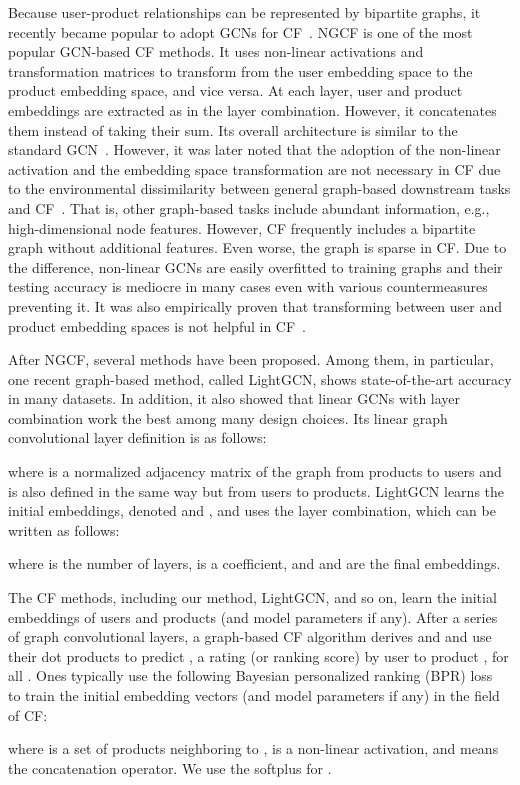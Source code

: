 \documentclass[sigconf]{acmart}
\begin{document}
Because user-product relationships can be represented by bipartite graphs, it recently became popular to adopt GCNs for CF~\cite{10.1145/3331184.3331267,Chen_Wu_Hong_Zhang_Wang_2020,10.1145/3397271.3401063}. NGCF is one of the most popular GCN-based CF methods. It uses non-linear activations and transformation matrices to transform from the user embedding space to the product embedding space, and vice versa. At each layer, user and product embeddings are extracted as in the layer combination. However, it concatenates them instead of taking their sum. Its overall architecture is similar to the standard GCN~\cite{kipf2017semi}. However, it was later noted that the adoption of the non-linear activation and the embedding space transformation are not necessary in CF due to the environmental dissimilarity between general graph-based downstream tasks and CF~\cite{10.1145/3397271.3401063}. That is, other graph-based tasks include abundant information, e.g., high-dimensional node features. However, CF frequently includes a bipartite graph without additional features. Even worse, the graph is sparse in CF. Due to the difference, non-linear GCNs are easily overfitted to training graphs and their testing accuracy is mediocre in many cases even with various countermeasures preventing it. It was also empirically proven that transforming between user and product embedding spaces is not helpful in CF~\cite{10.1145/3397271.3401063}.



After NGCF, several methods have been proposed. Among them, in particular, one recent graph-based method, called LightGCN, shows state-of-the-art accuracy in many datasets. In addition, it also showed that linear GCNs with layer combination work the best among many design choices. Its linear graph convolutional layer definition is as follows:
\begin{linenomath*}\end{linenomath*}where  is a normalized adjacency matrix of the graph from products to users and  is also defined in the same way but from users to products. LightGCN learns the initial embeddings, denoted  and , and uses the layer combination, which can be written as follows:
\begin{linenomath*}\end{linenomath*}where  is the number of layers,  is a coefficient, and  and  are the final embeddings.

The CF methods, including our method, LightGCN, and so on, learn the initial embeddings of users and products (and model parameters if any). After a series of  graph convolutional layers, a graph-based CF algorithm derives  and  and use their dot products to predict , a rating (or ranking score) by user  to product , for all . Ones typically use the following Bayesian personalized ranking (BPR) loss~\cite{10.5555/1795114.1795167} to train the initial embedding vectors (and model parameters if any) in the field of CF:
\begin{linenomath*}\end{linenomath*}where  is a set of products neighboring to ,  is a non-linear activation, and  means the concatenation operator. We use the softplus for .
\end{document}

